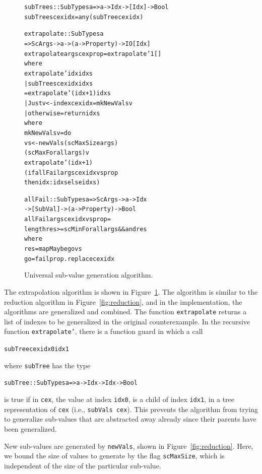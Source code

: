 \documentclass{sigplanconf}
\newenvironment{code}{\begin{alltt}}{\end{alltt}}
\newcommand{\ttp}[1]{\texttt{#1}}
\begin{document}
\begin{figure}
  \begin{code}
subTrees :: SubTypes a => a -> Idx -> [Idx] -> Bool
subTrees cex idx = any (subTree cex idx)

extrapolate :: SubTypes a
  => ScArgs -> a -> (a -> Property) -> IO [Idx]
extrapolate args cex prop = extrapolate' 1 []
  where
  extrapolate' idx idxs
    | subTrees cex idx idxs
    = extrapolate' (idx+1) idxs
    | Just v <- index cex idx = mkNewVals v
    | otherwise = return idxs
    where
    mkNewVals v = do
      vs <- newVals (scMaxSize args)
                    (scMaxForall args) v
      extrapolate' (idx+1)
        (if allFail args cex idx vs prop
           then idx:idxs else idxs)

allFail :: SubTypes a => ScArgs -> a -> Idx
  -> [SubVal] -> (a -> Property) -> Bool
allFail args cex idx vs prop =
  length res >= scMinForall args && and res
  where
  res  = mapMaybe go vs
  go   = fail prop . replace cex idx
  \end{code}
  \caption{Universal sub-value generation algorithm.}
  \label{fig:universal}
\end{figure}


The extrapolation algorithm is shown in Figure~\ref{fig:universal}.  The
algorithm is similar to the reduction algorithm in Figure~\ref{fig:reduction},
and in the implementation, the algorithms are generalized and combined.  The
function \ttp{extrapolate} returns a list of indexes to be generalized in the
original counterexample.  In the recursive function \ttp{extrapolate'}, there is
a function guard in which a call
%
\begin{code}
subTree cex idx0 idx1
\end{code}
%
\noindent
where \ttp{subTree} has the type
%
\begin{code}
subTree :: SubTypes a => a -> Idx -> Idx -> Bool
\end{code}
%
\noindent
is true if in \ttp{cex}, the value at index \ttp{idx0}, is a child of index
\ttp{idx1}, in a tree representation of \ttp{cex} (i.e., \ttp{subVals cex}).  This
prevents the algorithm from trying to generalize sub-values that are abstracted
away already since their parents have been generalized.

New sub-values are generated by \ttp{newVals}, shown in
Figure~\ref{fig:reduction}.  Here, we bound the size of values to generate by
the flag \ttp{scMaxSize}, which is independent of the size of the particular
sub-value.
\end{document}
